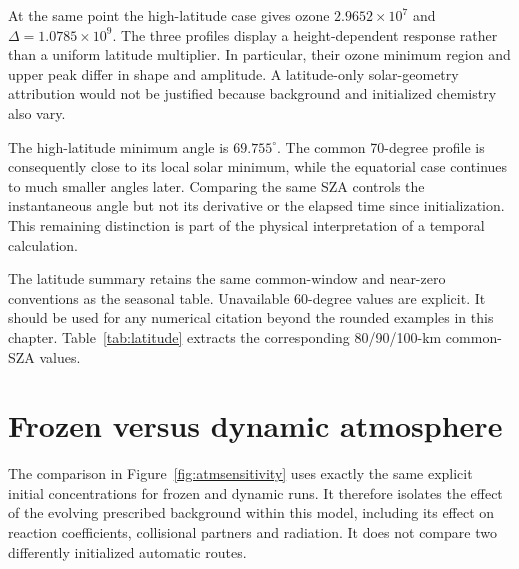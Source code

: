 At the same point the high-latitude case gives ozone $2.9652\times10^7$ and $\Delta=1.0785\times10^9$. The three profiles display a height-dependent response rather than a uniform latitude multiplier. In particular, their ozone minimum region and upper peak differ in shape and amplitude. A latitude-only solar-geometry attribution would not be justified because background and initialized chemistry also vary.


The high-latitude minimum angle is $69.755^\circ$. The common 70-degree profile is consequently close to its local solar minimum, while the equatorial case continues to much smaller angles later. Comparing the same SZA controls the instantaneous angle but not its derivative or the elapsed time since initialization. This remaining distinction is part of the physical interpretation of a temporal calculation.

The latitude summary retains the same common-window and near-zero conventions as the seasonal table. Unavailable 60-degree values are explicit. It should be used for any numerical citation beyond the rounded examples in this chapter.
Table~\ref{tab:latitude} extracts the corresponding 80/90/100-km common-SZA values.

\clearpage

\section{Frozen versus dynamic atmosphere}
The comparison in Figure~\ref{fig:atmsensitivity} uses exactly the same explicit initial concentrations for frozen and dynamic runs. It therefore isolates the effect of the evolving prescribed background within this model, including its effect on reaction coefficients, collisional partners and radiation. It does not compare two differently initialized automatic routes.

